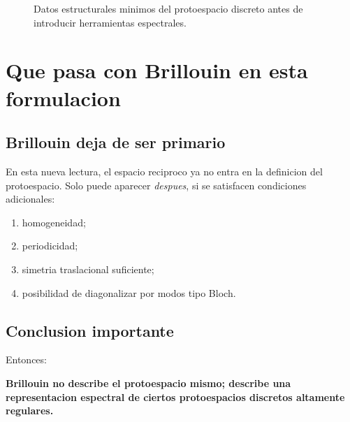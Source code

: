 \begin{figure}[h!]
\centering
{}
\caption{Datos estructurales minimos del protoespacio discreto antes de introducir herramientas espectrales.}
\end{figure}

\section{Que pasa con Brillouin en esta formulacion}
\subsection{Brillouin deja de ser primario}
En esta nueva lectura, el espacio reciproco ya no entra en la definicion del protoespacio. Solo puede aparecer \emph{despues}, si se satisfacen condiciones adicionales:
\begin{enumerate}[label=\arabic*.]
    \item homogeneidad;
    \item periodicidad;
    \item simetria traslacional suficiente;
    \item posibilidad de diagonalizar por modos tipo Bloch.
\end{enumerate}

\subsection{Conclusion importante}
Entonces:
\begin{displayquote}
\textbf{Brillouin no describe el protoespacio mismo; describe una representacion espectral de ciertos protoespacios discretos altamente regulares.}
\end{displayquote}


